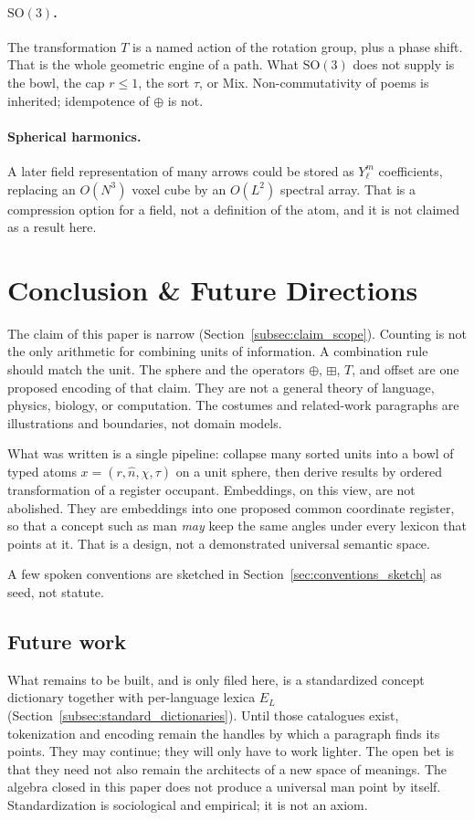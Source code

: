 \documentclass[12pt, a4paper]{article}
\begin{document}
\paragraph{$\mathrm{SO}(3)$.}
The transformation $T$ is a named action of the rotation group, plus a
phase shift. That is the whole geometric engine of a path. What
$\mathrm{SO}(3)$ does not supply is the bowl, the cap $r\le 1$, the
sort $\tau$, or Mix. Non-commutativity of poems is inherited;
idempotence of $\oplus$ is not.

\paragraph{Spherical harmonics.}
A later field representation of many arrows could be stored as
$Y_\ell^m$ coefficients, replacing an $O(N^3)$ voxel cube by an
$O(L^2)$ spectral array. That is a compression option for a field, not
a definition of the atom, and it is not claimed as a result here.

\section{Conclusion \& Future Directions}
\label{sec:conclusion}

The claim of this paper is narrow
(Section~\ref{subsec:claim_scope}). Counting is not the only
arithmetic for combining units of information. A combination rule
should match the unit. The sphere and the operators
$\oplus$, $\boxplus$, $T$, and offset are one proposed encoding of
that claim. They are not a general theory of language, physics,
biology, or computation. The costumes and related-work paragraphs
are illustrations and boundaries, not domain models.

What was written is a single pipeline: collapse many sorted units
into a bowl of typed atoms $x=(r,\hat n,\chi,\tau)$ on a unit sphere,
then derive results by ordered transformation of a register occupant.
Embeddings, on this view, are
not abolished. They are embeddings into one proposed common coordinate
register, so that a
concept such as $\mathrm{man}$ \emph{may} keep the same angles under every
lexicon that points at it. That is a design, not a demonstrated
universal semantic space.

A few spoken conventions are sketched in
Section~\ref{sec:conventions_sketch} as seed, not statute.

\subsection{Future work}
\label{subsec:future_work}
What remains to be built, and is only filed here, is a standardized
concept dictionary together with per-language lexica $E_L$
(Section~\ref{subsec:standard_dictionaries}). Until those catalogues
exist, tokenization and encoding remain the handles by which a
paragraph finds its points. They may continue; they will only have to
work lighter. The open bet is that they need not also
remain the architects of a new space of meanings.
The algebra closed in this paper does not produce a universal
$\mathrm{man}$ point by itself. Standardization is sociological and
empirical; it is not an axiom.
\end{document}
